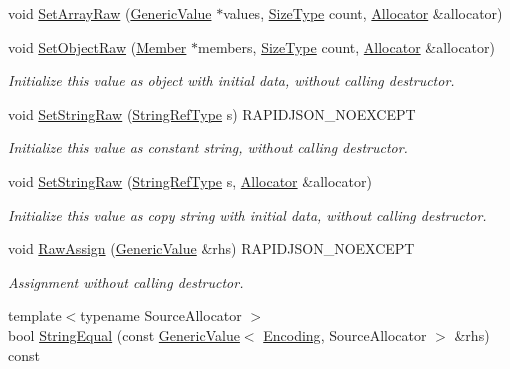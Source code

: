 \begin{DoxyCompactItemize}
\item 
void \mbox{\hyperlink{classrapidjson_1_1_generic_value_a9cc2eb5c196affb861560219a4973dd0}{Set\+Array\+Raw}} (\mbox{\hyperlink{classrapidjson_1_1_generic_value}{Generic\+Value}} $\ast$values, \mbox{\hyperlink{namespacerapidjson_a44eb33eaa523e36d466b1ced64b85c84}{Size\+Type}} count, \mbox{\hyperlink{classrapidjson_1_1_allocator}{Allocator}} \&allocator)
\item 
void \mbox{\hyperlink{classrapidjson_1_1_generic_value_a1efc6f69fe809557ae00dd322b7f79ac}{Set\+Object\+Raw}} (\mbox{\hyperlink{classrapidjson_1_1_generic_value_a0220ddebe2f023fa75b643a50e90e559}{Member}} $\ast$members, \mbox{\hyperlink{namespacerapidjson_a44eb33eaa523e36d466b1ced64b85c84}{Size\+Type}} count, \mbox{\hyperlink{classrapidjson_1_1_allocator}{Allocator}} \&allocator)
\begin{DoxyCompactList}\small\item\em Initialize this value as object with initial data, without calling destructor. \end{DoxyCompactList}\item 
void \mbox{\hyperlink{classrapidjson_1_1_generic_value_a248bab30562a4197cea0474d7f0ce835}{Set\+String\+Raw}} (\mbox{\hyperlink{classrapidjson_1_1_generic_value_a559eb9cea54364a35518b02f6d74f379}{String\+Ref\+Type}} s) R\+A\+P\+I\+D\+J\+S\+O\+N\+\_\+\+N\+O\+E\+X\+C\+E\+PT
\begin{DoxyCompactList}\small\item\em Initialize this value as constant string, without calling destructor. \end{DoxyCompactList}\item 
void \mbox{\hyperlink{classrapidjson_1_1_generic_value_abbca9846370d4749cdbb6bab9e44096c}{Set\+String\+Raw}} (\mbox{\hyperlink{classrapidjson_1_1_generic_value_a559eb9cea54364a35518b02f6d74f379}{String\+Ref\+Type}} s, \mbox{\hyperlink{classrapidjson_1_1_allocator}{Allocator}} \&allocator)
\begin{DoxyCompactList}\small\item\em Initialize this value as copy string with initial data, without calling destructor. \end{DoxyCompactList}\item 
void \mbox{\hyperlink{classrapidjson_1_1_generic_value_a00efe429e27f95dca17b19519b3cea9e}{Raw\+Assign}} (\mbox{\hyperlink{classrapidjson_1_1_generic_value}{Generic\+Value}} \&rhs) R\+A\+P\+I\+D\+J\+S\+O\+N\+\_\+\+N\+O\+E\+X\+C\+E\+PT
\begin{DoxyCompactList}\small\item\em Assignment without calling destructor. \end{DoxyCompactList}\item 
{\footnotesize template$<$typename Source\+Allocator $>$ }\\bool \mbox{\hyperlink{classrapidjson_1_1_generic_value_a19e954a8f4731fea785abe0defa0ac44}{String\+Equal}} (const \mbox{\hyperlink{classrapidjson_1_1_generic_value}{Generic\+Value}}$<$ \mbox{\hyperlink{classrapidjson_1_1_encoding}{Encoding}}, Source\+Allocator $>$ \&rhs) const
\end{DoxyCompactItemize}
